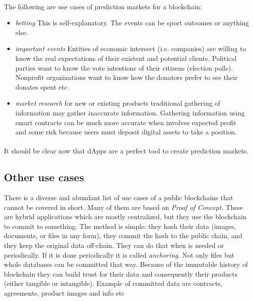 \documentclass{article}
\begin{document}
\paragraph{}
The following are use cases of prediction markets  for a blockchain:
\begin{itemize}
\item \emph{betting}
This is self-explanatory. The events can be sport outcomes or anything else.
\item \emph{important events} 
Entities of economic intersect (i.e. companies) are willing to know the real expectations of their existent and potential clients. Political parties want to know the vote intentions of their citizens (election polls). Nonprofit organizations want to know how the donators prefer to see their donates spent etc.
\item \emph{market research}
for new or existing products traditional gathering of information may gather inaccurate information. Gathering information using smart contracts can be much more accurate when involves expected profit and some risk because users must deposit digital assets to take a position.
\end{itemize}
\paragraph{}
It should be clear now that dApps are a perfect tool to create prediction markets.
 
\subsection{Other use cases}
There is a diverse and abundant list of use cases of a public blockchains that cannot be covered in short. Many of them are based on \emph{Proof of Concept}. These are hybrid applications which are mostly centralized, but they use the blockchain to commit to something. The method is simple: they hash their data (images, documents, or files in any form), they commit the hash to the public chain, and they keep the original data off-chain. They can do that when is needed or periodically. If it is done periodically it is called \emph{anchoring}. Not only files but whole databases can be committed that way. Because of the immutable history of blockchain they can build trust for their data and consequently their products (either tangible or intangible). Example of committed data are contracts, agreements, product images and info etc
\end{document}
